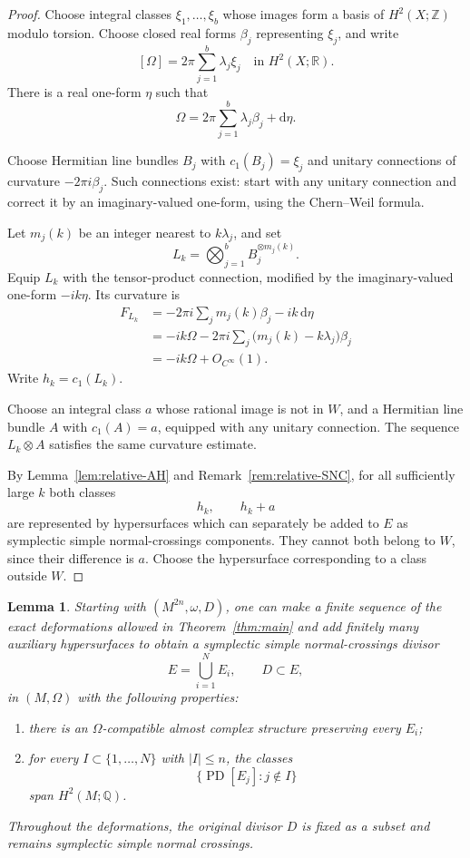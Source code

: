 \documentclass[11pt]{amsart}
\newtheorem{lemma}[theorem]{Lemma}
\theoremstyle{definition}
\theoremstyle{remark}
\newcommand{\R}{\mathbb R}
\newcommand{\Q}{\mathbb Q}
\newcommand{\Z}{\mathbb Z}
\newcommand{\dd}{\mathrm d}
\newcommand{\PD}{\operatorname{PD}}
\begin{document}
\begin{proof}
Choose integral classes $\xi_1,\ldots,\xi_b$ whose images form a
basis of $H^2(X;\Z)$ modulo torsion.  Choose closed real forms
$\beta_j$ representing $\xi_j$, and write
\[
[\Omega]=2\pi\sum_{j=1}^{b}\lambda_j\xi_j
\quad\text{in }H^2(X;\R).
\]
There is a real one-form $\eta$ such that
\[
\Omega=2\pi\sum_{j=1}^{b}\lambda_j\beta_j+\dd\eta.
\]

Choose Hermitian line bundles $B_j$ with $c_1(B_j)=\xi_j$ and
unitary connections of curvature $-2\pi i\beta_j$.
Such connections exist: start with any unitary connection and
correct it by an imaginary-valued one-form, using the
Chern--Weil formula.

Let $m_j(k)$ be an integer nearest to $k\lambda_j$, and set
\[
L_k=\bigotimes_{j=1}^{b}B_j^{\otimes m_j(k)}.
\]
Equip $L_k$ with the tensor-product connection, modified by
the imaginary-valued one-form $-ik\eta$.  Its curvature is
\begin{align*}
F_{L_k}
&=-2\pi i\sum_j m_j(k)\beta_j-ik\,\dd\eta\\
&=-ik\Omega
  -2\pi i\sum_j\bigl(m_j(k)-k\lambda_j\bigr)\beta_j\\
&=-ik\Omega+O_{C^\infty}(1).
\end{align*}
Write $h_k=c_1(L_k)$.

Choose an integral class $a$ whose rational image is not in $W$,
and a Hermitian line bundle $A$ with $c_1(A)=a$, equipped with
any unitary connection.  The sequence $L_k\otimes A$ satisfies
the same curvature estimate.

By Lemma~\ref{lem:relative-AH} and
Remark~\ref{rem:relative-SNC}, for all sufficiently large $k$
both classes
\[
h_k,\qquad h_k+a
\]
are represented by hypersurfaces which can separately be added
to $E$ as symplectic simple normal-crossings components.
They cannot both belong to $W$, since their difference is $a$.
Choose the hypersurface corresponding to a class outside $W$.
\end{proof}

\begin{lemma}\label{lem:redundant-enlargement}
Starting with $(M^{2n},\omega,D)$, one can make a finite sequence
of the exact deformations allowed in Theorem~\ref{thm:main} and
add finitely many auxiliary hypersurfaces to obtain a symplectic
simple normal-crossings divisor
\[
E=\bigcup_{i=1}^{N}E_i,\qquad D\subset E,
\]
in $(M,\Omega)$ with the following properties:
\begin{enumerate}[label=\textup{(\alph*)}]
\item there is an $\Omega$-compatible almost complex structure
      preserving every $E_i$;
\item for every $I\subset\{1,\ldots,N\}$ with $|I|\leq n$,
      the classes
      \[
      \{\PD[E_j]:j\notin I\}
      \]
      span $H^2(M;\Q)$.
\end{enumerate}
Throughout the deformations, the original divisor $D$ is fixed
as a subset and remains symplectic simple normal crossings.
\end{lemma}
\end{document}
